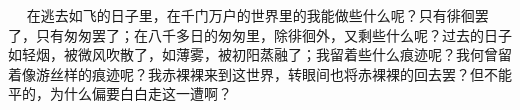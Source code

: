 \documentclass[addtable,answer,twoside,12pt]{hnuexam}
\begin{document}
\begin{questions}
\begin{solution}
　			在逃去如飞的日子里，在千门万户的世界里的我能做些什么呢？只有徘徊罢了，只有匆匆罢了；在八千多日的匆匆里，除徘徊外，又剩些什么呢？过去的日子如轻烟，被微风吹散了，如薄雾，被初阳蒸融了；我留着些什么痕迹呢？我何曾留着像游丝样的痕迹呢？我赤裸裸来到这世界，转眼间也将赤裸裸的回去罢？但不能平的，为什么偏要白白走这一遭啊？
		\end{solution}
\end{questions}
\end{document}
